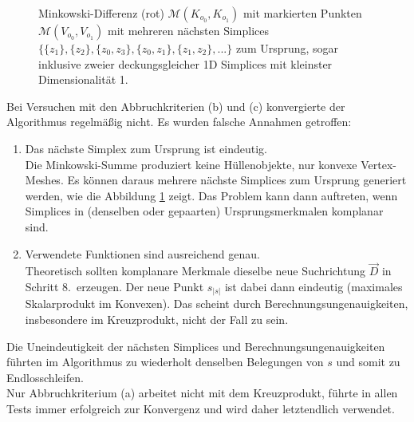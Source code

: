 \begin{enumerate}
\begin{figure}
	\caption{Minkowski-Differenz (rot) $\mathcal{M}(K_{o_0}, K_{o_1})$ mit markierten Punkten $\mathcal{M}(V_{o_0}, V_{o_1})$ mit mehreren nächsten Simplices $\{ \{z_1\},\{z_2\},\{z_0, z_3\},\{z_0,z_1\},\{z_1,z_2\}, ...\}$ zum Ursprung, sogar inklusive zweier deckungsgleicher 1D Simplices mit kleinster Dimensionalität 1.}
	\label{fig:parfeat}
\end{figure}

Bei Versuchen mit den Abbruchkriterien (b) und (c) konvergierte der Algorithmus regelmäßig nicht. Es wurden falsche Annahmen getroffen:
\begin{enumerate}
\item Das nächste Simplex zum Ursprung ist eindeutig.\\
Die Minkowski-Summe produziert keine Hüllenobjekte, nur konvexe Vertex-Meshes. Es können daraus mehrere nächste Simplices zum Ursprung generiert werden, wie die Abbildung \ref{fig:parfeat} zeigt. Das Problem kann dann auftreten, wenn Simplices in (denselben oder gepaarten) Ursprungsmerkmalen komplanar sind.
\item Verwendete Funktionen sind ausreichend genau.\\
Theoretisch sollten komplanare Merkmale dieselbe neue Suchrichtung $\vec{D}$ in Schritt 8.~erzeugen. Der neue Punkt $s_{|s|}$ ist dabei dann eindeutig (maximales Skalarprodukt im Konvexen). Das scheint durch Berechnungsungenauigkeiten, insbesondere im Kreuzprodukt, nicht der Fall zu sein. 
\end{enumerate}

Die Uneindeutigkeit der nächsten Simplices und Berechnungsungenauigkeiten führten im Algorithmus zu wiederholt denselben Belegungen von $s$ und somit zu Endlosschleifen.\\
Nur Abbruchkriterium (a) arbeitet nicht mit dem Kreuzprodukt, führte in allen Tests immer erfolgreich zur Konvergenz und wird daher letztendlich verwendet.
\end{enumerate}

